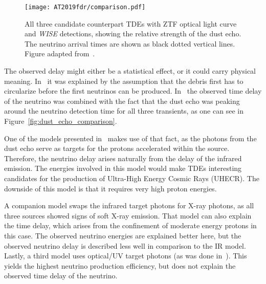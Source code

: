 \begin{figure*}[htb]
    \texttt{[image: AT2019fdr/comparison.pdf]}
    \caption[All candidate counterparts in comparison]{All three candidate counterpart TDEs with ZTF optical light curve and \textit{WISE} detections, showing the relative strength of the dust echo. The neutrino arrival times are shown as black dotted vertical lines. Figure adapted from~\cite{Velzen2021}.}
\end{figure*}

The observed delay might either be a statistical effect, or it could carry physical meaning. In~\cite{Velzen2021} it was explained by the assumption that the debris first has to circularize before the first neutrinos can be produced. In~ the observed time delay of the neutrino was combined with the fact that the dust echo was peaking around the neutrino detection time for all three transients, as one can see in Figure~\ref{fig:dust_echo_comparison}.

One of the models presented in~\cite{Winter2023} makes use of that fact, as the photons from the dust echo serve as targets for the protons accelerated within the source. Therefore, the neutrino delay arises naturally from the delay of the infrared emission. The energies involved in this model would make TDEs interesting candidates for the production of Ultra-High Energy Cosmic Rays (UHECR). The downside of this model is that it requires very high proton energies.

A companion model swaps the infrared target photons for X-ray photons, as all three sources showed signs of soft X-ray emission. That model can also explain the time delay, which arises from the confinement of moderate energy protons in this case. The observed neutrino energies are explained better here, but the observed neutrino delay is described less well in comparison to the IR model. Lastly, a third model uses optical/UV target photons (as was done in~\cite{Velzen2021}). This yields the highest neutrino production efficiency, but does not explain the observed time delay of the neutrino.